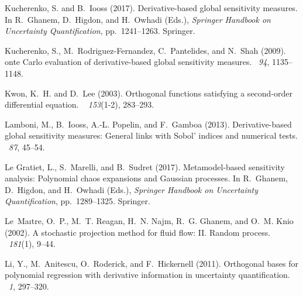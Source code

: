 \documentclass[a4paper,11pt]{article}
\theoremstyle{definition}
\theoremstyle{remark}
\theoremstyle{theorem}
\begin{document}
\begin{thebibliography}{}
	Kucherenko, S. and B.~Iooss (2017).
	\newblock Derivative-based global sensitivity measures.
	\newblock In R.~Ghanem, D.~Higdon, and H.~Owhadi (Eds.), {\em Springer Handbook
		on {Uncertainty Quantification}}, pp.\  1241--1263. Springer.
	
	Kucherenko, S., M.~Rodriguez-Fernandez, C.~Pantelides, and N.~Shah (2009).
	onte {C}arlo evaluation of derivative-based global sensitivity
	measures.
	~{\em 94}, 1135--1148.
	
	Kwon, K.~H. and D.~Lee (2003).
	\newblock Orthogonal functions satisfying a second-order differential equation.
	~{\em
		153\/}(1-2), 283--293.
	
	Lamboni, M., B.~Iooss, A.-L. Popelin, and F.~Gamboa (2013).
	\newblock Derivative-based global sensitivity measures: {G}eneral links with
	{S}obol' indices and numerical tests.
	~{\em 87}, 45--54.
	
	{Le Gratiet}, L., S.~Marelli, and B.~Sudret (2017).
	\newblock Metamodel-based sensitivity analysis: {P}olynomial chaos expansions
	and {G}aussian processes.
	\newblock In R.~Ghanem, D.~Higdon, and H.~Owhadi (Eds.), {\em Springer Handbook
		on {Uncertainty Quantification}}, pp.\  1289--1325. Springer.
	
	Le~Ma{\i}tre, O.~P., M.~T. Reagan, H.~N. Najm, R.~G. Ghanem, and O.~M. Knio
	(2002).
	\newblock A stochastic projection method for fluid flow: {II}. {R}andom
	process.
	~{\em 181\/}(1), 9--44.
	
	Li, Y., M.~Anitescu, O.~Roderick, and F.~Hickernell (2011).
	\newblock Orthogonal bases for polynomial regression with derivative
	information in uncertainty quantification.
	~{\em 1},
	297--320.
	

\end{thebibliography}
\end{document}
